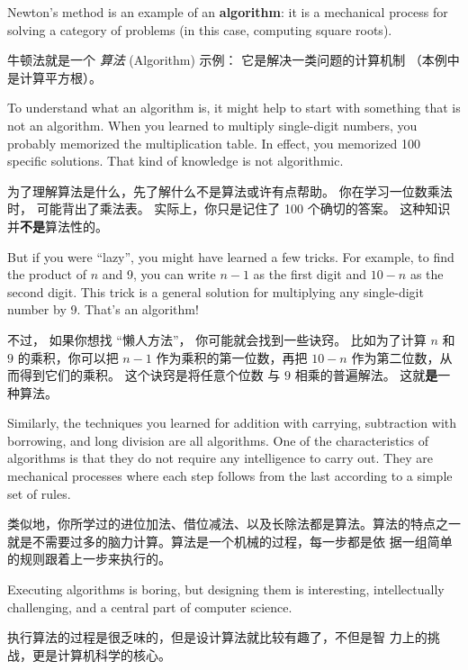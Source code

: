 Newton's method is an example of an {\bf algorithm}: it is a
mechanical process for solving a category of problems (in this
case, computing square roots).

牛顿法就是一个 {\em 算法} (Algorithm) 示例： 它是解决一类问题的计算机制
（本例中是计算平方根）。

To understand what an algorithm is, it might help to start with
something that is not an algorithm.  When you learned to multiply
single-digit numbers, you probably memorized the multiplication table.
In effect, you memorized 100 specific solutions.  That kind of
knowledge is not algorithmic.

为了理解算法是什么，先了解什么不是算法或许有点帮助。 你在学习一位数乘法时，
可能背出了乘法表。 实际上，你只是记住了 100 个确切的答案。 这种知识并{\bf 不是}算法性的。

But if you were ``lazy'', you might have learned a few
tricks.  For example, to find the product of $n$ and 9, you can
write $n-1$ as the first digit and $10-n$ as the second
digit.  This trick is a general solution for multiplying any
single-digit number by 9.  That's an algorithm!
  
  

不过， 如果你想找 ``懒人方法''， 你可能就会找到一些诀窍。 比如为了计算 $n$
和 $9$ 的乘积，你可以把 $n-1$ 作为乘积的第一位数，再把 $10-n$
作为第二位数，从而得到它们的乘积。 这个诀窍是将任意个位数
与 $9$ 相乘的普遍解法。 这就{\bf 是}一种算法。
  
  

Similarly, the techniques you learned for addition with carrying,
subtraction with borrowing, and long division are all algorithms.  One
of the characteristics of algorithms is that they do not require any
intelligence to carry out.  They are mechanical processes where
each step follows from the last according to a simple set of rules.

类似地，你所学过的进位加法、借位减法、以及长除法都是算法。算法的特点之一
就是不需要过多的脑力计算。算法是一个机械的过程，每一步都是依
据一组简单的规则跟着上一步来执行的。

Executing algorithms is boring, but designing them is interesting,
intellectually challenging, and a central part of computer science.

执行算法的过程是很乏味的，但是设计算法就比较有趣了，不但是智
力上的挑战，更是计算机科学的核心。

